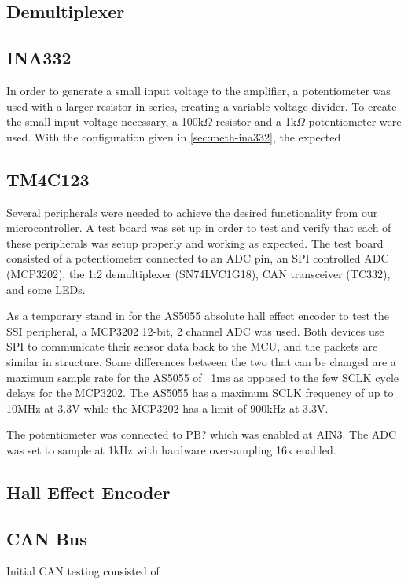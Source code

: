 \subsection{Demultiplexer}

\subsection{INA332}
In order to generate a small input voltage to the amplifier, a potentiometer was used with a larger resistor in series, creating a variable voltage divider. To create the small input voltage necessary, a 100k$\Omega$ resistor and a 1k$\Omega$ potentiometer were used. With the configuration given in \ref{sec:meth-ina332}, the expected 

\subsection{TM4C123}
Several peripherals were needed to achieve the desired functionality from our microcontroller. A test board was set up in order to test and verify that each of these peripherals was setup properly and working as expected. The test board consisted of a potentiometer connected to an ADC pin, an SPI controlled ADC (MCP3202), the 1:2 demultiplexer (SN74LVC1G18), CAN transceiver (TC332), and some LEDs.

As a temporary stand in for the AS5055 absolute hall effect encoder to test the SSI peripheral, a MCP3202 12-bit, 2 channel ADC was used. Both devices use SPI to communicate their sensor data back to the MCU, and the packets are similar in structure. Some differences between the two that can be changed are a maximum sample rate for the AS5055 of ~1ms as opposed to the few SCLK cycle delays for the MCP3202. The AS5055 has a maximum SCLK frequency of up to 10MHz at 3.3V while the MCP3202 has a limit of 900kHz at 3.3V. 

The potentiometer was connected to PB? which was enabled at AIN3. The ADC was set to sample at 1kHz with hardware oversampling 16x enabled. 
\subsection{Hall Effect Encoder}
\subsection{CAN Bus}
Initial CAN testing consisted of 
